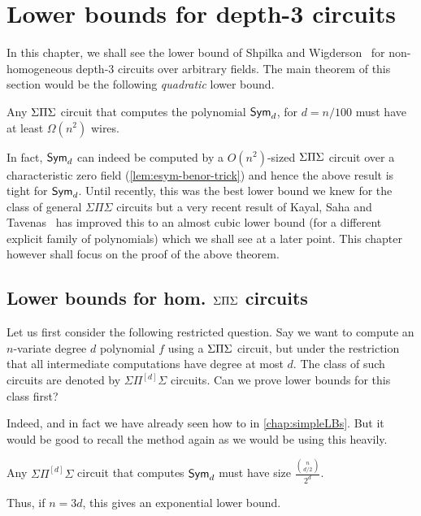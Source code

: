 \chapter{Lower bounds for depth-3 circuits}\label{chap:d3SW}

In this chapter, we shall see the lower bound of Shpilka and Wigderson~\cite{sw2001} for non-homogeneous depth-$3$ circuits over arbitrary fields.
The main theorem of this section would be the following \emph{quadratic} lower bound. 

\begin{theorem}[\cite{sw2001}]\label{thm:SW-SPS-main-thm}
Any $\Sigma\Pi\Sigma$ circuit that computes the polynomial $\operatorname{\mathsf{Sym}}_d$, for $d = n/100$ must have at least $\Omega(n^2)$ wires. 
\end{theorem}

In fact, $\operatorname{\mathsf{Sym}}_d$ can indeed be computed by a $O(n^2)$-sized  $\Sigma\Pi\Sigma$ circuit over a characteristic zero field (\cref{lem:esym-benor-trick}) and hence the above result is tight for $\operatorname{\mathsf{Sym}}_d$. 
Until recently, this was the best lower bound we knew for the class of general $\Sigma\Pi\Sigma$ circuits but a very recent result of Kayal, Saha and Tavenas~\cite{kst16} has improved this to an almost cubic lower bound (for a different explicit family of polynomials) which we shall see at a later point.
This chapter however shall focus on the proof of the above theorem.

\section{Lower bounds for hom. $\Sigma\Pi\Sigma$ circuits \cite{nw1997}}

Let us first consider the following restricted question.
Say we want to compute an $n$-variate degree $d$ polynomial $f$ using a $\Sigma\Pi\Sigma$ circuit, but under the restriction that all intermediate computations have degree at most $d$.
The class of such circuits are denoted by $\Sigma\Pi^{[d]}\Sigma$ circuits.
Can we prove lower bounds for this class first?

Indeed, and in fact we have already seen how to in \autoref{chap:simpleLBs}. But it would be good to recall the method again as we would be using this heavily. 

\begin{theorem}[\cite{nw1997}]\label{thm:hom-depth-3-lb-esym}
Any $\Sigma\Pi^{[d]}\Sigma$ circuit that computes $\operatorname{\mathsf{Sym}}_d$ must have size $\frac{\binom{n}{d/2}}{2^d}$. 
\end{theorem}
Thus, if $n = 3d$, this gives an exponential lower bound. 

